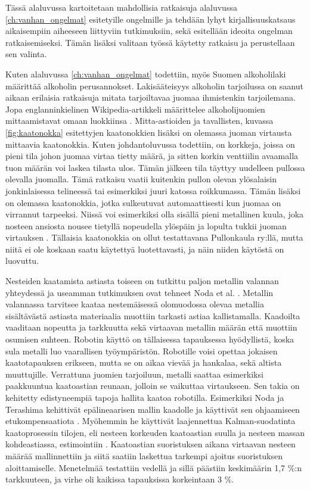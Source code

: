 Tässä alaluvussa kartoitetaan mahdollisia ratkaisuja alaluvussa \ref{ch:vanhan_ongelmat} esitetyille ongelmille ja tehdään lyhyt kirjallisuuskatsaus aikaisempiin aiheeseen liittyviin tutkimuksiin, sekä esitellään ideoita ongelman ratkaisemiseksi. Tämän lisäksi valitaan työssä käytetty ratkaisu ja perustellaan sen valinta.

Kuten alaluvussa \ref{ch:vanhan_ongelmat} todettiin, myös Suomen alkoholilaki määrittää alkoholin perusannokset. Lakisääteisyys alkoholin tarjoilussa on saanut aikaan erilaisia ratkaisuja mitata tarjoiltavaa juomaa ihmistenkin tarjoilemana. Jopa englanninkielinen Wikipedia-artikkeli määrittelee alkoholijuomien mittaamistavat omaan luokkiinsa \cite{Wikipedia}. Mitta-astioiden ja tavallisten, kuvassa \ref{fig:kaatonokka} esitettyjen kaatonokkien lisäksi on olemassa juoman virtausta mittaavia kaatonokkia. Kuten johdantoluvussa todettiin, on korkkeja, joissa on pieni tila johon juomaa virtaa tietty määrä, ja sitten korkin venttiilin avaamalla tuon määrän voi laskea tilasta ulos. Tämän jälkeen tila täyttyy uudelleen pullossa olevalla juomalla. Tämä ratkaisu vaatii kuitenkin pullon olevan ylösalaisin jonkinlaisessa telineessä tai esimerkiksi juuri katossa roikkumassa. Tämän lisäksi on olemassa kaatonokkia, jotka sulkeutuvat automaattisesti kun juomaa on virrannut tarpeeksi. Niissä voi esimerkiksi olla sisällä pieni metallinen kuula, joka nosteen ansiosta nousee tietyllä nopeudella ylöspäin ja lopulta tukkii juoman virtauksen \cite{Barproducts}. Tällaisia kaatonokkia on ollut testattavana Pullonkaula ry:llä, mutta niitä ei ole koskaan saatu käytettyä luotettavasti, ja näin niiden käytöstä on luovuttu.

Nesteiden kaatamista astiasta toiseen on tutkittu paljon metallin valannan yhteydessä ja useamman tutkimuksen ovat tehneet Noda et al. \cite{Noda2007,Noda2008,Noda2009}. Metallin valannassa tarvitsee kaataa nestemäisessä olomuodossa olevaa metallia sisältävästä astiasta materiaalia muottiin tarkasti astiaa kallistamalla. Kaadoilta vaaditaan nopeutta ja tarkkuutta sekä virtaavan metallin määrän että muottiin osumisen suhteen. Robotin käyttö on tällaisessa tapauksessa hyödyllistä, koska sula metalli luo vaarallisen työympäristön. Robotille voisi opettaa jokaisen kaatotapauksen erikseen, mutta se on aikaa vievää ja hankalaa, sekä altista muuttujille. Verrattuna juomien tarjoiluun, metalli saattaa esimerkiksi paakkuuntua kaatoastian reunaan, jolloin se vaikuttaa virtaukseen. Sen takia on kehitetty edistyneempiä tapoja hallita kaatoa robotilla. Esimerkiksi Noda ja Terashima kehittivät epälineaarisen mallin kaadolle ja käyttivät sen ohjaamiseen etukompensaatiota \cite{Noda2007}. Myöhemmin he käyttivät laajennettua Kalman-suodatinta kaatoprosessin tilojen, eli nesteen korkeuden kaatoastian suulla ja nesteen massan kohdeastiassa, estimointiin \cite{Noda2009}. Kaatoastian suoristuksen aikana virtaavan nesteen määrää mallinnettiin ja siitä saatiin laskettua tarkempi ajoitus suoristuksen aloittamiselle. Menetelmää testattiin vedellä ja sillä päästiin keskimäärin 1,7 \%:n tarkkuuteen, ja virhe oli kaikissa tapauksissa korkeintaan 3 \%.

